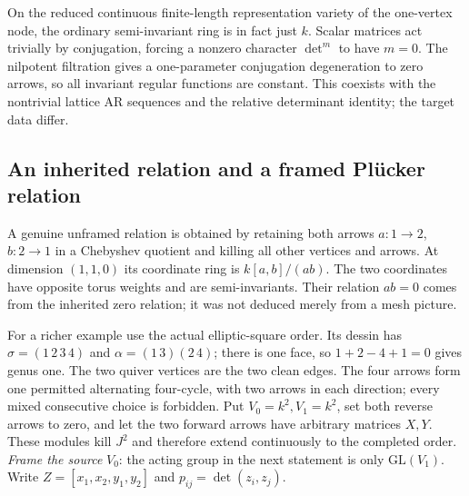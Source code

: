 \documentclass[11pt,oneside,openany]{book}
\theoremstyle{definition}\newtheorem{definition}[theorem]{Definition}
\theoremstyle{remark}\newtheorem{remark}[theorem]{Remark}
\begin{document}
On the reduced continuous finite-length representation variety of the
one-vertex node, the ordinary semi-invariant ring is in fact just $k$.
Scalar matrices act trivially by conjugation, forcing a nonzero character
$\det^m$ to have $m=0$. The nilpotent filtration gives a one-parameter
conjugation degeneration to zero arrows, so all invariant regular functions
are constant. This coexists with the nontrivial lattice AR sequences and
the relative determinant identity; the target data differ.

\subsection{An inherited relation and a framed Pl\"ucker relation}
A genuine unframed relation is obtained by retaining both arrows
$a:1\to2$, $b:2\to1$ in a Chebyshev quotient and killing all other vertices
and arrows. At dimension $(1,1,0)$ its coordinate ring is
$k[a,b]/(ab)$. The two coordinates have opposite torus weights and are
semi-invariants. Their relation $ab=0$ comes from the inherited zero relation;
it was not deduced merely from a mesh picture.

For a richer example use the actual elliptic-square order. Its dessin has
$\sigma=(1\,2\,3\,4)$ and $\alpha=(1\,3)(2\,4)$; there is one face,
so $1+2-4+1=0$ gives genus one. The two quiver vertices are the two clean
edges. The four arrows form one permitted alternating four-cycle, with two
arrows in each direction; every mixed consecutive choice is forbidden. Put
$V_0=k^2,V_1=k^2$, set both reverse arrows to zero, and let the two forward
arrows have arbitrary matrices $X,Y$. These modules kill $J^2$ and therefore
extend continuously to the completed order. \emph{Frame the source} $V_0$:
the acting group in the next statement is only $\mathrm{GL}(V_1)$.
Write $Z=[x_1,x_2,y_1,y_2]$ and $p_{ij}=\det(z_i,z_j)$.
\end{document}
